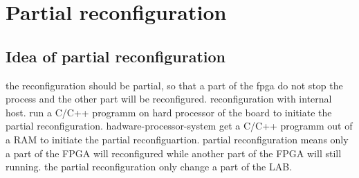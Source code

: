 \section{Partial reconfiguration}
\subsection{Idea of partial reconfiguration}
the reconfiguration should be partial, so that a part of the fpga do not stop the process and the
other part will be reconfigured. reconfiguration with internal host. run a C/C++ programm on hard
processor of the board to initiate the partial reconfiguration. hadware-processor-system get a C/C++ programm out of a RAM
to initiate the partial reconfiguartion. partial reconfiguration means only a part of the FPGA
will reconfigured while another part of the FPGA will still running. the partial reconfiguration
only change a part of the LAB.